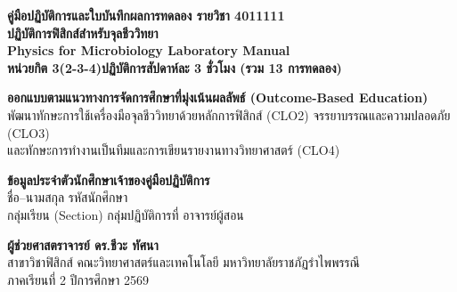 \begin{titlepage}
\thispagestyle{empty}
\begin{center}
    \vspace*{1.0cm}
    {\Large\bfseries\color{bioEmerald} คู่มือปฏิบัติการและใบบันทึกผลการทดลอง รายวิชา 4011111}\\[0.5cm]
    {\Huge\bfseries\color{physRoyalBlue} ปฏิบัติการฟิสิกส์สำหรับจุลชีววิทยา}\\[0.4cm]
    {\LARGE\bfseries\color{physAmber} Physics for Microbiology Laboratory Manual}\\[0.4cm]
    {\large\bfseries\color{charcoal} หน่วยกิต 3(2-3-4)\quad ปฏิบัติการสัปดาห์ละ 3 ชั่วโมง (รวม 13 การทดลอง)}\\[1.4cm]

    \begin{tcolorbox}[
        enhanced,
        colback=boxGreenBg,
        colframe=bioEmerald,
        width=14.2cm,
        arc=2.5mm,
        boxrule=1.0pt,
        halign=center
    ]
        {\normalsize\bfseries ออกแบบตามแนวทางการจัดการศึกษาที่มุ่งเน้นผลลัพธ์ (Outcome-Based Education)}\\[4pt]
        {\small พัฒนาทักษะการใช้เครื่องมือจุลชีววิทยาด้วยหลักการฟิสิกส์ (CLO2) จรรยาบรรณและความปลอดภัย (CLO3)}\\[2pt]
        {\small และทักษะการทำงานเป็นทีมและการเขียนรายงานทางวิทยาศาสตร์ (CLO4)}
    \end{tcolorbox}

    \vspace{1.2cm}
    \begin{tcolorbox}[
        enhanced,
        colback=softSmoke,
        colframe=physRoyalBlue,
        width=14.2cm,
        arc=2mm,
        boxrule=0.8pt
    ]
        \textbf{ข้อมูลประจำตัวนักศึกษาเจ้าของคู่มือปฏิบัติการ}\\[6pt]
        ชื่อ--นามสกุล \dotfill รหัสนักศึกษา \dotfill\\[6pt]
        กลุ่มเรียน (Section) \dotfill กลุ่มปฏิบัติการที่ \dotfill อาจารย์ผู้สอน \dotfill
    \end{tcolorbox}

    \vspace{1.2cm}
    {\Large\bfseries ผู้ช่วยศาสตราจารย์ ดร.ชีวะ ทัศนา}\\[0.25cm]
    {\normalsize สาขาวิชาฟิสิกส์ คณะวิทยาศาสตร์และเทคโนโลยี มหาวิทยาลัยราชภัฏรำไพพรรณี}\\[0.2cm]
    {\small ภาคเรียนที่ 2 ปีการศึกษา 2569}
\end{center}
\end{titlepage}
